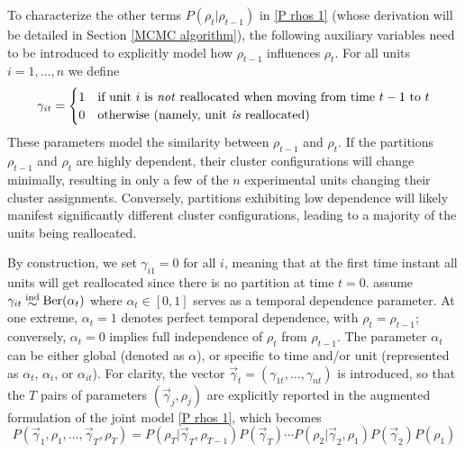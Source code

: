 \documentclass[12pt,	%
	a4paper,		%
	twoside,		%
	openright,		%
	titlepage,%
	]{book}
\theoremstyle{definition}
\let\cite\citep
\begin{document}
To characterize the other terms $P(\rho_t|\rho_{t-1})$ in \eqref{P rhos 1} (whose derivation will be detailed in Section \ref{MCMC algorithm}), the following auxiliary variables need to be introduced to explicitly model how $\rho_{t-1}$ influences $\rho_t$. For all units $i=1,\ldots,n$ we define
\begin{equation}
\gamma_{it} = \begin{cases}
    1 & \text{if unit $i$ is \emph{not} reallocated when moving from time $t-1$ to $t$} \\
    0 & \text{otherwise (namely, unit \emph{is} reallocated)}
\end{cases}
\end{equation}
These parameters model the similarity between $\rho_{t-1}$ and $\rho_t$. If the partitions $\rho_{t-1}$ and $\rho_{t}$ are highly dependent, their cluster configurations will change minimally, resulting in only a few of the $n$ experimental units changing their cluster assignments. Conversely, partitions exhibiting low dependence will likely manifest significantly different cluster configurations, leading to a majority of the units being reallocated.

By construction, we set $\gamma_{i1}=0$ for all $i$, meaning that at the first time instant all units will get reallocated since there is no partition at time $t=0$. \cite{1-drpm} assume $\gamma_{it} \mathrel{\raisebox{-2.1pt}{$\simind$}} \Ber(\alpha_t)$ where $\alpha_t \in [0,1]$ serves as a temporal dependence parameter. At one extreme, $\alpha_t=1$ denotes perfect temporal dependence, with $\rho_t = \rho_{t-1}$; conversely, $\alpha_t=0$ implies full independence of $\rho_t$ from $\rho_{t-1}$. The parameter $\alpha_t$ can be either global (denoted as $\alpha$), or specific to time and/or unit (represented as $\alpha_t$, $\alpha_i$, or $\alpha_{it}$). For clarity, the vector $\vec{\gamma}_t = (\gamma_{1t},\ldots,\gamma_{nt})$ is introduced, so that the $T$ pairs of parameters $(\vec{\gamma}_j,\rho_j)$ are explicitly reported in the augmented formulation of the joint model \eqref{P rhos 1}, which becomes
\begin{equation}
P(\vec{\gamma}_1,\rho_1, \ldots, \vec{\gamma}_T,\rho_T) = P(\rho_T|\vec{\gamma}_T,\rho_{T-1})P(\vec{\gamma}_T) \cdots P(\rho_2|\vec{\gamma}_2,\rho_1)P(\vec{\gamma}_2) P(\rho_1) 
\label{trpm - P rhos 2}
\end{equation}
\end{document}

